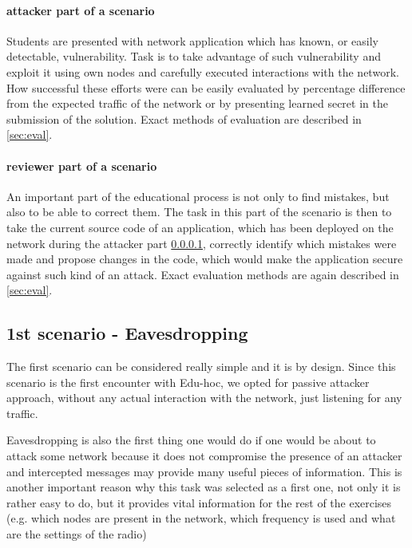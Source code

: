\documentclass[
  digital, %
  table,   %
  nolof,     %
  nolot,     %
           oneside
]{fithesis3}
\begin{document}
  \paragraph{attacker part of a scenario}\label{par:att}
    Students are presented with network application which has known, or easily detectable, vulnerability. Task is to take advantage of such vulnerability and exploit it using own nodes and carefully executed interactions with the network. How successful these efforts were can be easily evaluated by percentage difference from the expected traffic of the network or by presenting learned secret in the submission of the solution. Exact methods of evaluation are described in \ref{sec:eval}.

  \paragraph{reviewer part of a scenario}
    An important part of the educational process is not only to find mistakes, but also to be able to correct them. The task in this part of the scenario is then to take the current source code of an application, which has been deployed on the network during the attacker part \ref{par:att}, correctly identify which mistakes were made and propose changes in the code, which would make the application secure against such kind of an attack. Exact evaluation methods are again described in \ref{sec:eval}.


    \subsection{1st scenario - Eavesdropping}\label{subsec:1st}
    The first scenario can be considered really simple and it is by design. Since this scenario is the first encounter with Edu-hoc, we opted for passive attacker approach, without any actual interaction with the network, just listening for any traffic.

    Eavesdropping is also the first thing one would do if one would be about to attack some network because it does not compromise the presence of an attacker and intercepted messages may provide many useful pieces of information. This is another important reason why this task was selected as a first one, not only it is rather easy to do, but it provides vital information for the rest of the exercises (e.g. which nodes are present in the network, which frequency is used and what are the settings of the radio)
\end{document}
